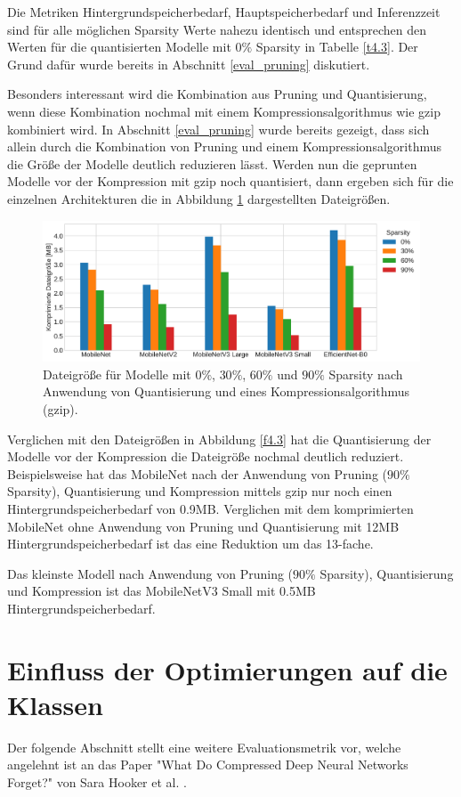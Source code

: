 Die Metriken Hintergrundspeicherbedarf, Hauptspeicherbedarf und Inferenzzeit sind für alle möglichen Sparsity Werte nahezu identisch und entsprechen den Werten für die quantisierten Modelle mit $0\%$ Sparsity in Tabelle \ref{t4.3}. Der Grund dafür wurde bereits in Abschnitt \ref{eval_pruning} diskutiert.

Besonders interessant wird die Kombination aus Pruning und Quantisierung, wenn diese Kombination nochmal mit einem Kompressionsalgorithmus wie gzip kombiniert wird. In Abschnitt \ref{eval_pruning} wurde bereits gezeigt, dass sich allein durch die Kombination von Pruning und einem Kompressionsalgorithmus die Größe der Modelle deutlich reduzieren lässt. Werden nun die geprunten Modelle vor der Kompression mit gzip noch quantisiert, dann ergeben sich für die einzelnen Architekturen die in Abbildung \ref{f4.5} dargestellten Dateigrößen.

\begin{figure}[htbp]
\centerline{\includegraphics[width=\textwidth]{content/images/pruned_and_compressed_quantized.pdf}}
\caption{Dateigröße für Modelle mit $0\%$, $30\%$, $60\%$ und $90\%$ Sparsity nach Anwendung von Quantisierung und eines Kompressionsalgorithmus (gzip).}
\label{f4.5}
\end{figure}

Verglichen mit den Dateigrößen in Abbildung \ref{f4.3} hat die Quantisierung der Modelle vor der Kompression die Dateigröße nochmal deutlich reduziert. Beispielsweise hat das MobileNet nach der Anwendung von Pruning ($90\%$ Sparsity), Quantisierung und Kompression mittels gzip nur noch einen Hintergrundspeicherbedarf von 0.9MB. Verglichen mit dem komprimierten MobileNet ohne Anwendung von Pruning und Quantisierung mit 12MB Hintergrundspeicherbedarf ist das eine Reduktion um das 13-fache.

Das kleinste Modell nach Anwendung von Pruning ($90\%$ Sparsity), Quantisierung und Kompression ist das MobileNetV3 Small mit 0.5MB Hintergrundspeicherbedarf.


\section{Einfluss der Optimierungen auf die Klassen}
Der folgende Abschnitt stellt eine weitere Evaluationsmetrik vor, welche angelehnt ist an das Paper "What Do Compressed Deep Neural Networks Forget?" von Sara Hooker et al. \cite{hooker_what_2020}.

